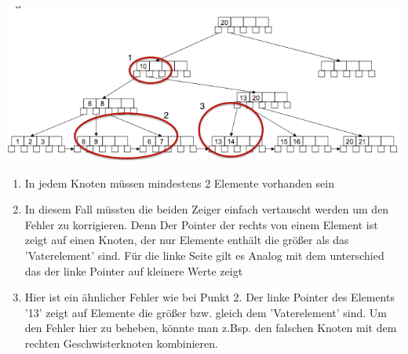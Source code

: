 \documentclass[12pt]{article}
\begin{document}
\includegraphics[width=\textwidth]{B+Baum_falsch.png}

\begin{enumerate}
    \item In jedem Knoten müssen mindestens 2 Elemente vorhanden sein

    \item In diesem Fall müssten die beiden Zeiger einfach vertauscht werden um den Fehler zu korrigieren. Denn Der Pointer der rechts von einem Element ist zeigt auf einen Knoten, der nur Elemente enthält die größer als das 'Vaterelement' sind. Für die linke Seite gilt es Analog mit dem unterschied das der linke Pointer auf kleinere Werte zeigt

    \item Hier ist ein ähnlicher Fehler wie bei Punkt 2. Der linke Pointer des Elements '13' zeigt auf Elemente die größer bzw. gleich dem 'Vaterelement' sind. Um den Fehler hier zu beheben, könnte man z.Bsp. den falschen Knoten mit dem rechten Geschwisterknoten kombinieren.
 
\end{enumerate}
\end{document}
